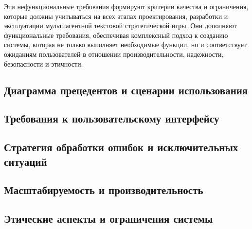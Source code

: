 Эти нефункциональные требования формируют критерии качества и ограничения, которые должны учитываться на всех этапах проектирования, разработки и эксплуатации мультиагентной текстовой стратегической игры. Они дополняют функциональные требования, обеспечивая комплексный подход к созданию системы, которая не только выполняет необходимые функции, но и соответствует ожиданиям пользователей в отношении производительности, надежности, безопасности и этичности.

\subsection{Диаграмма прецедентов и сценарии использования}

\subsection{Требования к пользовательскому интерфейсу}

\subsection{Стратегия обработки ошибок и исключительных ситуаций}

\subsection{Масштабируемость и производительность}

\subsection{Этические аспекты и ограничения системы}